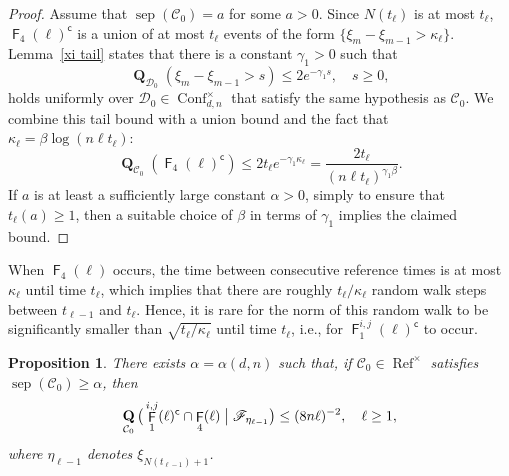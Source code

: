 \documentclass[11pt,reqno]{amsart}
\newtheorem{proposition}[lemma]{Proposition}
\theoremstyle{definition}
\numberwithin{equation}{section}
\newcommand{\1}{\mathbf{1}}
\DeclareMathOperator{\QQ}{\mathbf{Q}}
\DeclareMathOperator{\PPprod}{\mathbf{Q}}
\DeclareMathOperator{\sep}{sep}
\DeclareMathOperator{\Refcon}{\mathrm{Ref}}
\newcommand{\cc}{\mathsf{c}}
\DeclareMathOperator{\FF}{\mathsf{F}}
\newcommand{\CC}{\mathcal{C}}
\DeclareMathOperator{\Conf}{\mathrm{Conf}}
\begin{document}
\begin{proof}
Assume that $\sep (\CC_0) = a$ for some $a > 0$. 
Since $N(t_\ell)$ is at most $t_\ell$, $\FF_4 (\ell)^\cc$ is a union of at most $t_\ell$ events of the form $\{\xi_m - \xi_{m-1} > \kappa_\ell\}$. Lemma~\ref{xi tail} states that there is a constant $\gamma_1 > 0$ such that 
\[
\QQ_{\mathcal{D}_0} (\xi_m - \xi_{m-1} > s) \leq 2e^{-\gamma_1 s}, \quad s \geq 0,
\] 
holds uniformly over $\mathcal{D}_0 \in \Conf_{d,n}^\times$ that satisfy the same hypothesis as $\CC_0$. We combine this tail bound with a union bound and the fact that $\kappa_\ell = \beta \log ( n \ell t_\ell)$:
\[
\QQ_{\CC_0} ( \FF_4 (\ell)^\cc ) \leq 2t_\ell e^{-\gamma_1 \kappa_\ell} = \frac{2 t_\ell}{(n\ell t_\ell)^{\gamma_1 \beta}}.
\]
If $a$ is at least a sufficiently large constant $\alpha > 0$, simply to ensure that $t_\ell (a) \geq 1$, then a suitable choice of $\beta$ in terms of $\gamma_1$ implies the claimed bound.
\end{proof}

When $\FF_4 (\ell)$ occurs, the time between consecutive reference times is at most $\kappa_\ell$ until time $t_\ell$, which implies that there are roughly $t_\ell / \kappa_\ell$ random walk steps between $t_{\ell-1}$ and $t_\ell$. Hence, it is rare for the norm of this random walk to be significantly smaller than $\sqrt{t_\ell /\kappa_\ell}$ until time $t_\ell$, i.e., for $\FF_1^{i,j} (\ell)^\cc$ to occur.

\begin{proposition}\label{t before n}
There exists $\alpha = \alpha (d,n)$ such that, if $\CC_0 \in \Refcon^\times$ satisfies $\sep (\CC_0) \geq \alpha$, then
\begin{equation}\label{t bef n eq}
\PPprod_{\CC_0} \big( \FF_1^{i,j} (\ell)^\cc \cap \FF_4 (\ell) \bigm\vert \mathscr{F}_{\eta_{\ell-1}} \big) 
\leq (8 n \ell)^{-2}, \quad \ell \geq 1,
\end{equation}
where $\eta_{\ell-1}$ denotes $\xi_{N(t_{\ell-1})+1}$.
\end{proposition}
\end{document}
